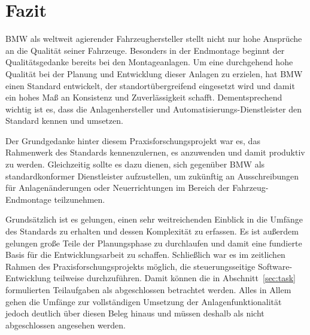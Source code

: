 

\chapter{Fazit}

BMW als weltweit agierender Fahrzeughersteller stellt nicht nur hohe Ansprüche an die Qualität seiner Fahrzeuge. Besonders in der Endmontage beginnt der Qualitätsgedanke bereits bei den Montageanlagen. Um eine durchgehend hohe Qualität bei der Planung und Entwicklung dieser Anlagen zu erzielen, hat BMW einen Standard entwickelt, der standortübergreifend eingesetzt wird und damit ein hohes Maß an Konsistenz und Zuverlässigkeit schafft. Dementsprechend wichtig ist es, dass die Anlagenhersteller und Automatisierungs-Dienstleister den Standard kennen und umsetzen.\par

Der Grundgedanke hinter diesem Praxisforschungsprojekt war es, das Rahmenwerk des Standards kennenzulernen, es anzuwenden und damit produktiv zu werden. Gleichzeitig sollte es dazu dienen, sich gegenüber BMW als standardkonformer Dienstleister aufzustellen, um zukünftig an Ausschreibungen für Anlagenänderungen oder Neuerrichtungen im Bereich der Fahrzeug-Endmontage teilzunehmen.\par

Grundsätzlich ist es gelungen, einen sehr weitreichenden Einblick in die Umfänge des Standards zu erhalten und dessen Komplexität zu erfassen. Es ist außerdem gelungen große Teile der Planungsphase zu durchlaufen und damit eine fundierte Basis für die Entwicklungsarbeit zu schaffen. Schließlich war es im zeitlichen Rahmen des Praxisforschungsprojekts möglich, die steuerungsseitige Software-Entwicklung teilweise durchzuführen. Damit können die in Abschnitt~\ref{sec:task} formulierten Teilaufgaben als abgeschlossen betrachtet werden. Alles in Allem gehen die Umfänge zur vollständigen Umsetzung der Anlagenfunktionalität jedoch deutlich über diesen Beleg hinaus und müssen deshalb als nicht abgeschlossen angesehen werden. %
